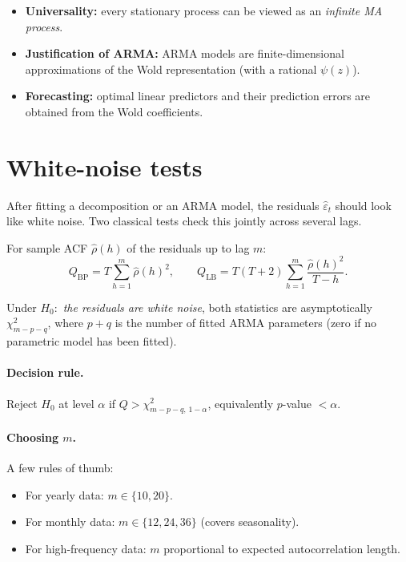 \begin{rembox}
\begin{itemize}
  \item \textbf{Universality:} every stationary process can be viewed
        as an \emph{infinite MA process}.
  \item \textbf{Justification of ARMA:} ARMA models are
        finite-dimensional approximations of the Wold representation
        (with a rational $\psi(z)$).
  \item \textbf{Forecasting:} optimal linear predictors and their
        prediction errors are obtained from the Wold coefficients.
\end{itemize}
\end{rembox}

\section{White-noise tests}
\label{sec:wn-tests}

After fitting a decomposition or an ARMA model, the residuals
$\widehat\varepsilon_t$ should look like white noise. Two classical
tests check this jointly across several lags.

\begin{defbox}
\label{def:lb}
For sample ACF $\widehat\rho(h)$ of the residuals up to lag $m$:
\[
  Q_{\text{BP}} = T \sum_{h = 1}^{m} \widehat\rho(h)^2,
  \qquad
  Q_{\text{LB}} = T(T + 2) \sum_{h = 1}^{m} \frac{\widehat\rho(h)^2}{T - h}.
\]
\end{defbox}

\begin{thbox}
\label{th:lb}
Under $H_0 :$ \emph{the residuals are white noise}, both statistics
are asymptotically $\chi^2_{m - p - q}$, where $p + q$ is the number
of fitted ARMA parameters (zero if no parametric model has been
fitted).
\end{thbox}

\paragraph{Decision rule.} Reject $H_0$ at level $\alpha$ if
$Q > \chi^2_{m - p - q,\, 1 - \alpha}$, equivalently $p$-value $< \alpha$.

\paragraph{Choosing $m$.} A few rules of thumb:
\begin{itemize}
  \item For yearly data: $m \in \{10, 20\}$.
  \item For monthly data: $m \in \{12, 24, 36\}$ (covers seasonality).
  \item For high-frequency data: $m$ proportional to expected
        autocorrelation length.
\end{itemize}

